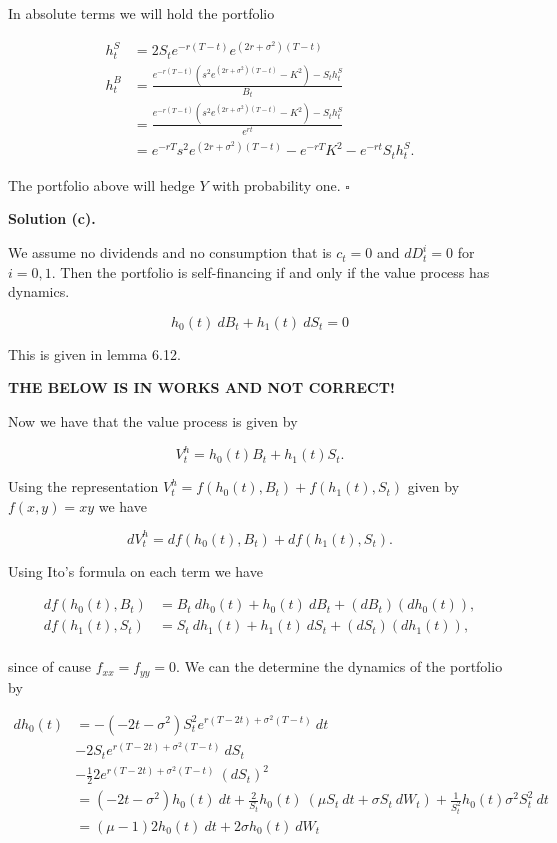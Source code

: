 \documentclass[
]{article}
\begin{document}
In absolute terms we will hold the portfolio

\begin{align*}
h_t^S&=2S_te^{-r(T-t)}e^{(2r+\sigma^2)(T-t)}\\
h_t^B&=\frac{e^{-r(T-t)}\left(s^2e^{(2r+\sigma^2)(T-t)}-K^2\right)-S_th_t^S}{B_t}\\
&=\frac{e^{-r(T-t)}\left(s^2e^{(2r+\sigma^2)(T-t)}-K^2\right)-S_th_t^S}{e^{rt}}\\
&=e^{-rT}s^2e^{(2r+\sigma^2)(T-t)}-e^{-rT}K^2-e^{-rt}S_th_t^S.
\end{align*}

The portfolio above will hedge \(Y\) with probability one. \(\square\)

\textbf{Solution (c).}

We assume no dividends and no consumption that is \(c_t=0\) and
\(dD_t^i=0\) for \(i=0,1\). Then the portfolio is self-financing if and
only if the value process has dynamics.

\[
h_0(t)\ dB_t+h_1(t)\ dS_t=0
\]

This is given in lemma 6.12.

\textbf{THE BELOW IS IN WORKS AND NOT CORRECT!}

Now we have that the value process is given by

\[
V_t^h=h_0(t)B_t+h_1(t)S_t.
\]

Using the representation \(V_t^h=f(h_0(t),B_t)+f(h_1(t),S_t)\) given by
\(f(x,y)=xy\) we have

\[
dV_t^h=df(h_0(t),B_t)+df(h_1(t),S_t).
\]

Using Ito's formula on each term we have

\begin{align*}
df(h_0(t),B_t)&=B_t\ dh_0(t)+h_0(t)\ dB_t+(dB_t)(dh_0(t)),\\
df(h_1(t),S_t)&=S_t\ dh_1(t)+h_1(t)\ dS_t+(dS_t)(dh_1(t)),\\
\end{align*}

since of cause \(f_{xx}=f_{yy}=0\). We can the determine the dynamics of
the portfolio by

\begin{align*}
dh_0(t)&=-(-2t-\sigma^2)S_t^2e^{r(T-2t)+\sigma^2(T-t)}\ dt\\
&-2S_te^{r(T-2t)+\sigma^2(T-t)}\ dS_t\\
&-\frac{1}{2}2e^{r(T-2t)+\sigma^2(T-t)}\ (dS_t)^2\\
&=(-2t-\sigma^2)h_0(t)\ dt+\frac{2}{S_t}h_0(t)\ (\mu S_t\ dt+\sigma S_t\ dW_t)+\frac{1}{S_t^2}h_0(t) \sigma^2S_t^2\ dt\\
&=(\mu-1)2h_0(t)\ dt+2\sigma h_0(t)\ dW_t
\end{align*}
\end{document}
